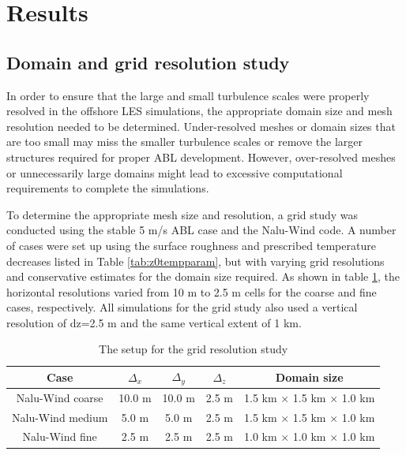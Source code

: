 \section{Results}

\subsection{\label{sec:gridstudy}Domain and grid resolution study}

In order to ensure that the large and small turbulence scales were
properly resolved in the offshore LES simulations, the appropriate
domain size and mesh resolution needed to be determined.
Under-resolved meshes or domain sizes that are too small may miss the
smaller turbulence scales or remove the larger structures required for
proper ABL development.  However, over-resolved meshes or
unnecessarily large domains might lead to excessive computational
requirements to complete the simulations.

To determine the appropriate mesh size and resolution, a grid study
was conducted using the stable 5 m/s ABL case and the Nalu-Wind code.
A number of cases were set up using the surface roughness and
prescribed temperature decreases listed in Table
\ref{tab:z0tempparam}, but with varying grid resolutions and
conservative estimates for the domain size required.  As shown in
table \ref{tab:GridStudySetup}, the horizontal resolutions varied from
10 m to 2.5 m cells for the coarse and fine cases, respectively.  All
simulations for the grid study also used a vertical resolution of
dz=2.5 m and the same vertical extent of 1 km.

\begin{table}
\caption{\label{tab:GridStudySetup} The setup for the grid resolution study} \centering
\begin{tabular}{ccccc}
  \hline
  Case              & $\Delta_x$ & $\Delta_y$ & $\Delta_z$ & Domain size \\
  \hline
  Nalu-Wind coarse  &  10.0 m  & 10.0 m & 2.5 m & 1.5 km $\times$ 1.5 km $\times$ 1.0 km  \\
  Nalu-Wind medium  &   5.0 m &  5.0 m  & 2.5 m & 1.5 km $\times$ 1.5 km $\times$ 1.0 km  \\
  Nalu-Wind fine    &   2.5 m &  2.5 m  & 2.5 m & 1.0 km $\times$ 1.0 km $\times$ 1.0 km  \\
\hline
\end{tabular}
\end{table}


